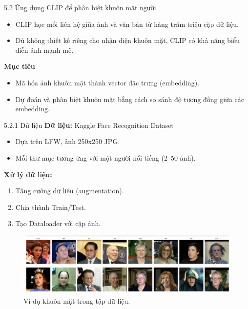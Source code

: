 \begin{frame}{5.2 Ứng dụng CLIP để phân biệt khuôn mặt người}
\begin{itemize}
    \item CLIP học mối liên hệ giữa ảnh và văn bản từ hàng trăm triệu cặp dữ liệu.
    \item Dù không thiết kế riêng cho nhận diện khuôn mặt, CLIP có khả năng biểu diễn ảnh mạnh mẽ.
\end{itemize}
\textbf{Mục tiêu}
\begin{itemize}
    \item Mã hóa ảnh khuôn mặt thành vector đặc trưng (embedding).
    \item Dự đoán và phân biệt khuôn mặt bằng cách so sánh độ tương đồng giữa các embedding.
\end{itemize}
\end{frame}

\begin{frame}{5.2.1 Dữ liệu}
\textbf{Dữ liệu:} Kaggle Face Recognition Dataset
\begin{itemize}
    \item Dựa trên LFW, ảnh 250x250 JPG.
    \item Mỗi thư mục tương ứng với một người nổi tiếng (2–50 ảnh).
\end{itemize}
\textbf{Xử lý dữ liệu:}
\begin{enumerate}
    \item Tăng cường dữ liệu (augmentation).
    \item Chia thành Train/Test.
    \item Tạo Dataloader với cặp ảnh.
\end{enumerate}
\begin{figure}
    \centering
    \includegraphics[width=0.75\linewidth]{img/05-Face.png}
    \caption{Ví dụ khuôn mặt trong tập dữ liệu.}
\end{figure}
\end{frame}


